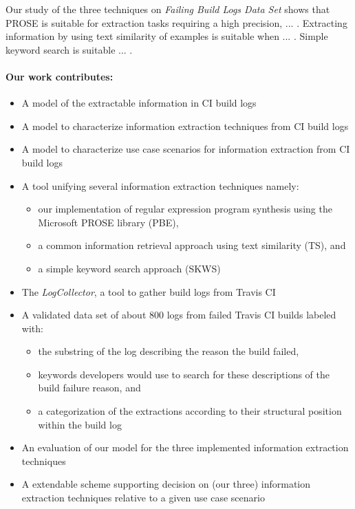 \documentclass[\myrootdir/main.tex]{subfiles}
\begin{document}
Our study of the three techniques on \emph{Failing Build Logs Data Set} shows that PROSE is suitable for extraction tasks requiring a high precision, ... . Extracting information by using text similarity of examples is suitable when ... . Simple keyword search is suitable ... .


\paragraph{Our work contributes:}
\begin{itemize}
  \item A model of the extractable information in CI build logs
  \item A model to characterize information extraction techniques from CI build logs
  \item A model to characterize use case scenarios for information extraction from CI build logs
  \item A tool unifying several information extraction techniques namely:
        \begin{itemize}
          \item our implementation of regular expression program synthesis using the Microsoft PROSE library (PBE),
          \item a common information retrieval approach using text similarity (TS), and
          \item a simple keyword search approach (SKWS)
        \end{itemize}
  \item The \emph{LogCollector}, a tool to gather build logs from Travis CI
  \item A validated data set of about 800 logs from failed Travis CI builds labeled with:
        \begin{itemize}
          \item the substring of the log describing the reason the build failed,
          \item keywords developers would use to search for these descriptions of the build failure reason, and
          \item a categorization of the extractions according to their structural position within the build log
        \end{itemize}
  \item An evaluation of our model for the three implemented information extraction techniques 
  \item A extendable scheme supporting decision on (our three) information extraction techniques relative to a given use case scenario
\end{itemize}
\end{document}

